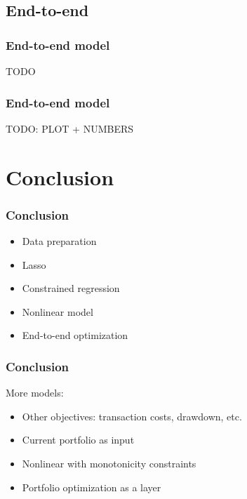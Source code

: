 \documentclass[a4paper,12pt,compress,serif]{beamer}
\begin{document}
\subsection{End-to-end}
\begin{frame}
  \frametitle{End-to-end model}
  TODO
\end{frame}

\begin{frame}
  \frametitle{End-to-end model}
  TODO: PLOT + NUMBERS
\end{frame}

\section{Conclusion}
\begin{frame}
  \frametitle{Conclusion}
  \begin{itemize}
  \item Data preparation
  \item Lasso
  \item Constrained regression
  \item Nonlinear model
  \item End-to-end optimization
  \end{itemize}    
\end{frame}

\begin{frame}
  \frametitle{Conclusion}
  More models:
  \begin{itemize}
  \item Other objectives: transaction costs, drawdown, etc.
  \item Current portfolio as input
  \item Nonlinear with monotonicity constraints
  \item Portfolio optimization as a layer
  \end{itemize}
\end{frame}
\end{document}
